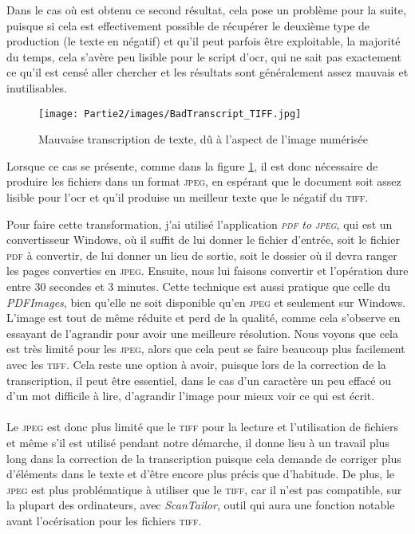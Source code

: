 Dans le cas où est obtenu ce second résultat, cela pose un problème pour la suite, puisque si cela est effectivement possible de récupérer le deuxième type de production (le texte en négatif) et qu'il peut parfois être exploitable, la majorité du temps, cela s'avère peu lisible pour le script d'\acrshort{ocr}, qui ne sait pas exactement ce qu'il est censé aller chercher et les résultats sont généralement assez mauvais et inutilisables.
\begin{figure}[p]
    \centering
    \texttt{[image: Partie2/images/BadTranscript\_TIFF.jpg]}
    \caption{Mauvaise transcription de texte, dû à l'aspect de l'image numérisée}
    \label{fig:badtranscript}
\end{figure}
Lorsque ce cas se présente, comme dans la figure \ref{fig:badtranscript}, il est donc nécessaire de produire les fichiers dans un format \textsc{jpeg}, en espérant que le document soit assez lisible pour l'\acrshort{ocr} et qu'il produise un meilleur texte que le négatif du \textsc{tiff}.

Pour faire cette transformation, j'ai utilisé l'application \emph{\textsc{pdf} to \textsc{jpeg}}, qui est un convertisseur Windows, où il suffit de lui donner le fichier d'entrée, soit le fichier \textsc{pdf} à convertir, de lui donner un lieu de sortie, soit le dossier où il devra ranger les pages converties en \textsc{jpeg}. Ensuite, nous lui faisons convertir et l'opération dure entre 30 secondes et 3 minutes. Cette technique est aussi pratique que celle du \emph{PDFImages}, bien qu'elle ne soit disponible qu'en \textsc{jpeg} et seulement sur Windows. L'image est tout de même réduite et perd de la qualité, comme cela s'observe en essayant de l'agrandir pour avoir une meilleure résolution. Nous voyons que cela est très limité pour les \textsc{jpeg}, alors que cela peut se faire beaucoup plus facilement avec les \textsc{tiff}. Cela reste une option à avoir, puisque lors de la correction de la transcription, il peut être essentiel, dans le cas d'un caractère un peu effacé ou d'un mot difficile à lire, d'agrandir l'image pour mieux voir ce qui est écrit.

\paragraph{} Le \textsc{jpeg} est donc plus limité que le \textsc{tiff} pour la lecture et l'utilisation de fichiers et même s'il est utilisé pendant notre démarche, il donne lieu à un travail plus long dans la correction de la transcription puisque cela demande de corriger plus d'éléments dans le texte et d'être encore plus précis que d'habitude. De plus, le \textsc{jpeg} est plus problématique à utiliser que le \textsc{tiff}, car il n'est pas compatible, sur la plupart des ordinateurs, avec \emph{ScanTailor}, outil qui aura une fonction notable avant l'océrisation pour les fichiers \textsc{tiff}.

